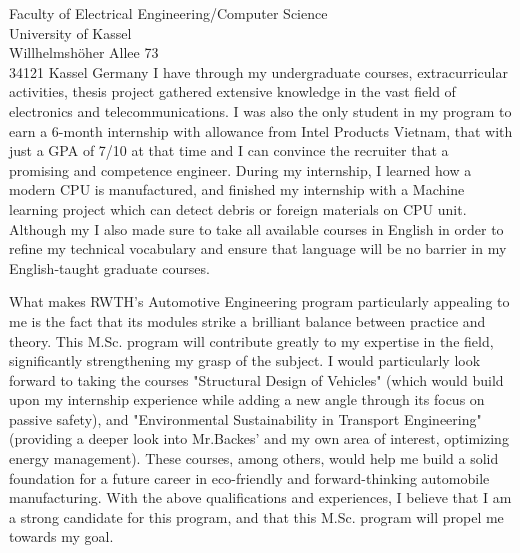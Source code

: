 \documentclass[a4paper,12pt]{letter}
\begin{document}
\begin{letter}{
    Faculty of Electrical Engineering/Computer Science
    \\ University of Kassel
    \\ Willhelmshöher Allee 73
    \\ 34121 Kassel Germany
}
I have through my undergraduate courses, extracurricular activities, thesis project gathered extensive knowledge in the vast field of electronics and telecommunications. I was also the only student in my program to earn a 6-month internship with allowance from Intel Products Vietnam, that with just a GPA of 7/10 at that time and I can convince the recruiter that a promising and competence engineer. During my internship, I learned how a modern CPU is manufactured, and finished my internship with a Machine learning project which can detect debris or foreign materials on CPU unit. 
Although my  I also made sure to take all available courses in English in order to refine my technical vocabulary and ensure that language will be no barrier in my English-taught graduate courses.

What makes RWTH's Automotive Engineering program particularly appealing to me is the fact that its modules strike a brilliant balance between practice and theory. This M.Sc. program will contribute greatly to my expertise in the field, significantly strengthening my grasp of the subject. I would particularly look forward to taking the courses "Structural Design of Vehicles" (which would build upon my internship experience while adding a new angle through its focus on passive safety), and "Environmental Sustainability in Transport Engineering" (providing a deeper look into Mr.Backes' and my own area of interest, optimizing energy management). These courses, among others, would help me build a solid foundation for a future career in eco-friendly and forward-thinking automobile manufacturing. With the above qualifications and experiences, I believe that I am a strong candidate for this program, and that this M.Sc. program will propel me towards my goal.


\end{letter}
\end{document}
